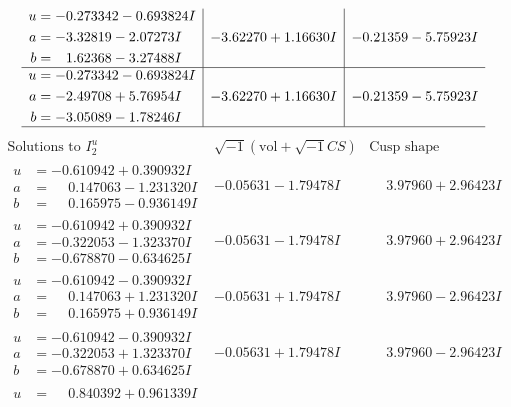 \documentclass[1p]{elsarticle_modified}
\theoremstyle{definition}
\newcommand{\I}{\sqrt{-1}}
\begin{document}
$$\begin{array}{c|c|c}
\begin{aligned}
u &= -0.273342 - 0.693824 I \\
a &= -3.32819 - 2.07273 I \\
b &= \phantom{-}1.62368 - 3.27488 I\end{aligned}
 & -3.62270 + 1.16630 I & -0.21359 - 5.75923 I \\ \hline\begin{aligned}
u &= -0.273342 - 0.693824 I \\
a &= -2.49708 + 5.76954 I \\
b &= -3.05089 - 1.78246 I\end{aligned}
 & -3.62270 + 1.16630 I & -0.21359 - 5.75923 I\\
 \hline 
 \end{array}$$\newpage$$\begin{array}{c|c|c}  
\text{Solutions to }I^u_{2}& \I (\text{vol} + \sqrt{-1}CS) & \text{Cusp shape}\\
 \hline 
\begin{aligned}
u &= -0.610942 + 0.390932 I \\
a &= \phantom{-}0.147063 - 1.231320 I \\
b &= \phantom{-}0.165975 - 0.936149 I\end{aligned}
 & -0.05631 - 1.79478 I & \phantom{-}3.97960 + 2.96423 I \\ \hline\begin{aligned}
u &= -0.610942 + 0.390932 I \\
a &= -0.322053 - 1.323370 I \\
b &= -0.678870 - 0.634625 I\end{aligned}
 & -0.05631 - 1.79478 I & \phantom{-}3.97960 + 2.96423 I \\ \hline\begin{aligned}
u &= -0.610942 - 0.390932 I \\
a &= \phantom{-}0.147063 + 1.231320 I \\
b &= \phantom{-}0.165975 + 0.936149 I\end{aligned}
 & -0.05631 + 1.79478 I & \phantom{-}3.97960 - 2.96423 I \\ \hline\begin{aligned}
u &= -0.610942 - 0.390932 I \\
a &= -0.322053 + 1.323370 I \\
b &= -0.678870 + 0.634625 I\end{aligned}
 & -0.05631 + 1.79478 I & \phantom{-}3.97960 - 2.96423 I \\ \hline\begin{aligned}
u &= \phantom{-}0.840392 + 0.961339 I \\

\end{aligned}
\end{array}$$
\end{document}
